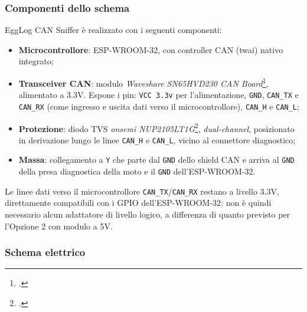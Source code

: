 \subsubsection{Componenti dello schema}

EggLog CAN Sniffer è realizzato con i seguenti componenti:

\begin{itemize}
    \item \textbf{Microcontrollore}: ESP-WROOM-32, con controller CAN (\gls{twai}) nativo integrato;
    \item \textbf{Transceiver CAN}: modulo \textit{Waveshare SN65HVD230 CAN Board}\footcite{site:SN65HVD230}, alimentato a 3.3V. 
    Espone i pin: \texttt{VCC 3.3v} per l'alimentazione, \texttt{GND}, \texttt{CAN\_TX} e \texttt{CAN\_RX} 
    (come ingresso e uscita dati verso il microcontrollore), \texttt{CAN\_H} e \texttt{CAN\_L};
    \item \textbf{Protezione}: diodo TVS \textit{onsemi NUP2105LT1G}\footcite{site:NUP2105LT1G}, \textit{dual-channel}, posizionato in derivazione lungo le linee \texttt{CAN\_H} e
    \texttt{CAN\_L}, vicino al connettore diagnostico;
    \item \textbf{Massa}: collegamento a \texttt{Y} che parte dal \texttt{GND} dello shield CAN e arriva al \texttt{GND} della presa diagnostica della moto e
     il \texttt{GND} dell'ESP-WROOM-32.
\end{itemize}

Le linee dati verso il microcontrollore \texttt{CAN\_TX}/\texttt{CAN\_RX} restano a
livello 3.3V, direttamente compatibili con i GPIO dell'ESP-WROOM-32: non è quindi necessario alcun
adattatore di livello logico, a differenza di quanto previsto per l'Opzione 2 con modulo a 5V.

\subsubsection{Schema elettrico}

